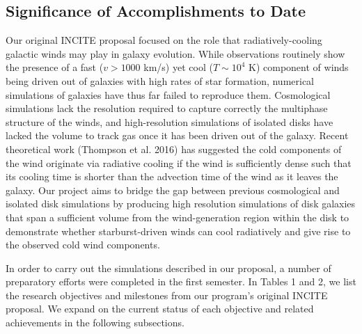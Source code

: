 \documentclass[11pt,letterpaper,english]{article}
\begin{document}
\subsection{Significance of Accomplishments to Date} 


Our original INCITE proposal focused on the role that radiatively-cooling galactic winds may play in galaxy evolution. While observations routinely show the presence of a fast ($v > 1000$ km/s) yet cool ($T\sim10^4$ K) component of winds being driven out of galaxies with high rates of star formation, numerical simulations of galaxies have thus far failed to reproduce them. Cosmological simulations lack the resolution required to capture correctly the multiphase structure of the winds, and high-resolution simulations of isolated disks have lacked the volume to track gas once it has been driven out of the galaxy. Recent theoretical work (Thompson et al. 2016) has suggested the cold components of the wind originate via radiative cooling
if the wind is sufficiently dense such that its cooling time is shorter than the advection time of the
wind as it leaves the galaxy.
Our project aims to bridge the gap between previous cosmological and isolated disk simulations by producing high resolution simulations of disk galaxies that span a sufficient volume from the wind-generation region within the disk to demonstrate whether starburst-driven winds can cool radiatively and give rise to the 
observed cold wind components.

In order to carry out the simulations described in our proposal, a number of preparatory efforts were completed in the first semester. In Tables 1 and 2, we list the research objectives and milestones from our program's original INCITE proposal. We expand on the current status of each objective and related achievements in the following subsections.
\end{document}

